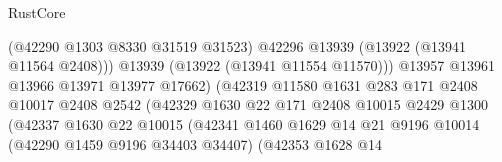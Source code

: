 \begin{lexlean}{RustCore}
\begin{coremodule}
                                                    (@42290 @1303 @8330 @31519 @31523)
                                                    @42296
                                                    @13939
                                                    (@13922 (@13941 @11564 @2408)))
                                                  @13939
                                                  (@13922 (@13941 @11554 @11570)))
                                                @13957
                                                @13961
                                                @13966
                                                @13971
                                                @13977
                                                @17662)
                                              (@42319
                                                @11580
                                                @1631
                                                @283
                                                @171
                                                @2408
                                                @10017
                                                @2408
                                                @2542
                                                (@42329
                                                  @1630
                                                  @22
                                                  @171
                                                  @2408
                                                  @10015
                                                  @2429
                                                  @1300
                                                  (@42337
                                                    @1630
                                                    @22
                                                    @10015
                                                    (@42341
                                                      @1460
                                                      @1629
                                                      @14
                                                      @21
                                                      @9196
                                                      @10014
                                                      (@42290 @1459 @9196 @34403 @34407)
                                                      (@42353
                                                        @1628
                                                        @14

\end{coremodule}
\end{lexlean}
